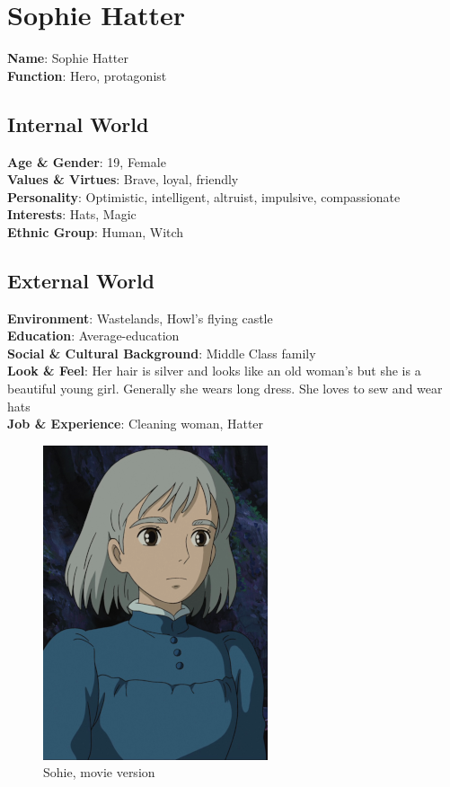 \section{Sophie Hatter}

\begin{minipage}{0.5\textwidth}
\textbf{Name}: Sophie Hatter \\
\textbf{Function}: Hero, protagonist

\subsection{Internal World}

\textbf{Age \& Gender}: 19, Female \\
\textbf{Values \& Virtues}: Brave, loyal, friendly \\
\textbf{Personality}: Optimistic, intelligent, altruist, impulsive, compassionate \\
\textbf{Interests}: Hats, Magic \\
\textbf{Ethnic Group}: Human, Witch

\subsection{External World}
\textbf{Environment}: Wastelands, Howl’s flying castle \\
\textbf{Education}: Average-education \\
\textbf{Social \& Cultural Background}: Middle Class family \\
\textbf{Look \& Feel}: Her hair is silver and looks like an old woman’s but she is a beautiful young girl. Generally she wears long dress. She loves to sew and wear hats \\
\textbf{Job \& Experience}: Cleaning woman, Hatter \\

\end{minipage}%
%
\hfill\begin{minipage}{0.4\textwidth}
\begin{figure}[H]
  \includegraphics{Images/Characters/sophie}
  \caption{Sohie, movie version}
  \end{figure}
\end{minipage}

